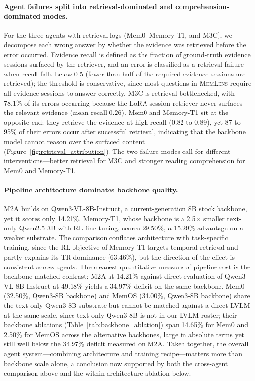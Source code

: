 \documentclass{article}
\newcommand{\bench}{\textsc{MemLens}}
\begin{document}
\paragraph{Agent failures split into retrieval-dominated and comprehension-dominated modes.}
For the three agents with retrieval logs (Mem0, Memory-T1, and M3C), we decompose each wrong answer by whether the evidence was retrieved before the error occurred. Evidence recall is defined as the fraction of ground-truth evidence sessions surfaced by the retriever, and an error is classified as a retrieval failure when recall falls below 0.5 (fewer than half of the required evidence sessions are retrieved); the threshold is conservative, since most questions in \bench{} require all evidence sessions to answer correctly. M3C is retrieval-bottlenecked, with 78.1\% of its errors occurring because the LoRA session retriever never surfaces the relevant evidence (mean recall 0.26). Mem0 and Memory-T1 sit at the opposite end: they retrieve the evidence at high recall (0.82 to 0.89), yet 87 to 95\% of their errors occur after successful retrieval, indicating that the backbone model cannot reason over the surfaced content (Figure~\ref{fig:retrieval_attribution}). The two failure modes call for different interventions---better retrieval for M3C and stronger reading comprehension for Mem0 and Memory-T1.

\paragraph{Pipeline architecture dominates backbone quality.}
M2A builds on Qwen3-VL-8B-Instruct, a current-generation 8B stock backbone, yet it scores only 14.21\%. Memory-T1, whose backbone is a 2.5$\times$ smaller text-only Qwen2.5-3B with RL fine-tuning, scores 29.50\%, a 15.29\% advantage on a weaker substrate. The comparison conflates architecture with task-specific training, since the RL objective of Memory-T1 targets temporal retrieval and partly explains its TR dominance (63.46\%), but the direction of the effect is consistent across agents. The cleanest quantitative measure of pipeline cost is the backbone-matched contrast: M2A at 14.21\% against direct evaluation of Qwen3-VL-8B-Instruct at 49.18\% yields a 34.97\% deficit on the same backbone. Mem0 (32.50\%, Qwen3-8B backbone) and MemOS (34.00\%, Qwen3-8B backbone) share the text-only Qwen3-8B substrate but cannot be matched against a direct LVLM at the same scale, since text-only Qwen3-8B is not in our LVLM roster; their backbone ablations (Table~\ref{tab:backbone_ablation}) span 14.65\% for Mem0 and 2.50\% for MemOS across the alternative backbones, large in absolute terms yet still well below the 34.97\% deficit measured on M2A. Taken together, the overall agent system---combining architecture and training recipe---matters more than backbone scale alone, a conclusion now supported by both the cross-agent comparison above and the within-architecture ablation below.
\end{document}

